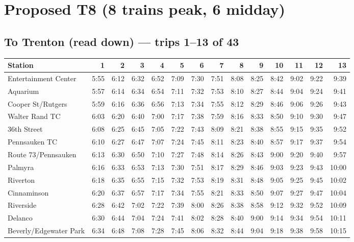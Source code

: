 \section{Proposed T8 (8 trains peak, 6 midday)}\label{tt:proposed_T8}
\subsection*{To Trenton (read down) --- trips 1--13 of 43}
\begin{center}\footnotesize\setlength{\tabcolsep}{3pt}\begin{tabular}{@{}lrrrrrrrrrrrrr@{}}\toprule
Station & 1 & 2 & 3 & 4 & 5 & 6 & 7 & 8 & 9 & 10 & 11 & 12 & 13 \\\midrule
Entertainment Center & 5:55 & 6:12 & 6:32 & 6:52 & 7:09 & 7:30 & 7:51 & 8:08 & 8:25 & 8:42 & 9:02 & 9:22 & 9:39 \\
Aquarium & 5:57 & 6:14 & 6:34 & 6:54 & 7:11 & 7:32 & 7:53 & 8:10 & 8:27 & 8:44 & 9:04 & 9:24 & 9:41 \\
Cooper St/Rutgers & 5:59 & 6:16 & 6:36 & 6:56 & 7:13 & 7:34 & 7:55 & 8:12 & 8:29 & 8:46 & 9:06 & 9:26 & 9:43 \\
Walter Rand TC & 6:03 & 6:20 & 6:40 & 7:00 & 7:17 & 7:38 & 7:59 & 8:16 & 8:33 & 8:50 & 9:10 & 9:30 & 9:47 \\
36th Street & 6:08 & 6:25 & 6:45 & 7:05 & 7:22 & 7:43 & 8:09 & 8:21 & 8:38 & 8:55 & 9:15 & 9:35 & 9:52 \\
Pennsauken TC & 6:10 & 6:27 & 6:47 & 7:07 & 7:24 & 7:45 & 8:11 & 8:23 & 8:40 & 8:57 & 9:17 & 9:37 & 9:54 \\
Route 73/Pennsauken & 6:13 & 6:30 & 6:50 & 7:10 & 7:27 & 7:48 & 8:14 & 8:26 & 8:43 & 9:00 & 9:20 & 9:40 & 9:57 \\
Palmyra & 6:16 & 6:33 & 6:53 & 7:13 & 7:30 & 7:51 & 8:17 & 8:29 & 8:46 & 9:03 & 9:23 & 9:43 & 10:00 \\
Riverton & 6:18 & 6:35 & 6:55 & 7:15 & 7:32 & 7:53 & 8:19 & 8:31 & 8:48 & 9:05 & 9:25 & 9:45 & 10:02 \\
Cinnaminson & 6:20 & 6:37 & 6:57 & 7:17 & 7:34 & 7:55 & 8:21 & 8:33 & 8:50 & 9:07 & 9:27 & 9:47 & 10:04 \\
Riverside & 6:28 & 6:42 & 7:02 & 7:22 & 7:39 & 8:00 & 8:26 & 8:38 & 8:58 & 9:12 & 9:32 & 9:52 & 10:09 \\
Delanco & 6:30 & 6:44 & 7:04 & 7:24 & 7:41 & 8:02 & 8:28 & 8:40 & 9:00 & 9:14 & 9:34 & 9:54 & 10:11 \\
Beverly/Edgewater Park & 6:34 & 6:48 & 7:08 & 7:28 & 7:45 & 8:06 & 8:32 & 8:44 & 9:04 & 9:18 & 9:38 & 9:58 & 10:15 \\

\end{tabular}
\end{center}
